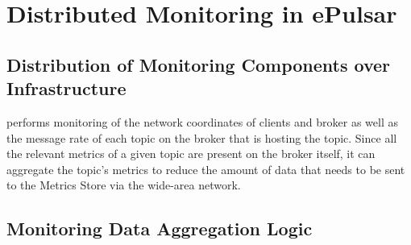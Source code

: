 \section{Distributed Monitoring in ePulsar}
\label{sec:epulsar_dist_mon}
\subsection{Distribution of Monitoring Components over Infrastructure}
\epulsar{} performs monitoring of the network coordinates of clients and broker as well as the message rate of each topic on the broker that is hosting the topic. Since all the relevant metrics of a given topic are present on the broker itself, it can aggregate the topic's metrics to reduce the amount of data that needs to be sent to the Metrics Store via the wide-area network.

\subsection{Monitoring Data Aggregation Logic}

